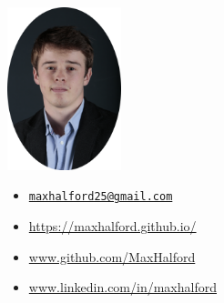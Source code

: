 \begin{minipage}{.25\textwidth}
\includegraphics[width=33mm]{img/face_oval}
\end{minipage}%
\begin{minipage}{.27\textwidth}
\end{minipage}%
\begin{minipage}{.48\textwidth}
\begin{itemize}
    \renewcommand\labelitemi{}
    \item \large{\faEnvelope} \textcolor{orange}{\href{mailto:maxhalford25@gmail.com}{\texttt{maxhalford25@gmail.com}}}
    \item \large{\faChild} \textcolor{magenta}{\url{https://maxhalford.github.io/}}
    \item \large{\faGithub} \textcolor{cyan}{\url{www.github.com/MaxHalford}}
    \item \large{\faLinkedin} \textcolor{green}{\url{www.linkedin.com/in/maxhalford}}
\end{itemize}
\end{minipage}
